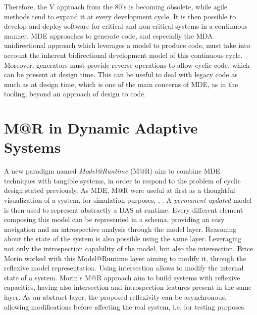 Therefore, the V approach from the 80's is becoming obsolete, while agile methods tend to expand it at every development cycle.
It is then possible to develop and deploy software for critical and non-critical systems in a continuous manner.
MDE approaches to generate code, and especially the MDA unidirectional approach which leverages a model to produce code, must take into account the inherent bidirectional development model of this continuous cycle.
Moreover, generators must provide reverse operations to allow cyclic code, which can be present at design time.
This can be useful to deal with legacy code as much as at design time, which is one of the main concerns of MDE, as in the tooling, beyond an approach of design to code.

\section{M@R in Dynamic Adaptive Systems}
A new paradigm named \textit{Model@Runtime} (M@R) aim to combine MDE techniques with tangible systems, in order to respond to the problem of cyclic design stated previously.
As MDE, M@R were useful at first as a thoughtful visualization of a system, for simulation purposes\cite{oreizy1999architecture}, \cite{blair2009models}, \cite{zhang2006model}.
A \textit{permanent updated} model is then used to represent abstractly a DAS at runtime.
Every different element composing this model can be represented in a schema, providing an easy navigation and an introspective analysis through the model layer.
Reasoning about the state of the system is also possible using the same layer.
Leveraging not only the introspection capability of the model, but also the intersection, Brice Morin\cite{morin2010leveraging} worked with this Model@Runtime layer aiming to modify it, through the reflexive model representation.
Using intersection allows to modify the internal state of a system\cite{paepcke1993object}.
Morin's M@R approach aim to build systems with reflexive capacities, having also intersection and introspection features present in the same layer.
As an abstract layer, the proposed reflexivity can be asynchronous, allowing modifications before affecting the real system, i.e. for testing purposes. 

